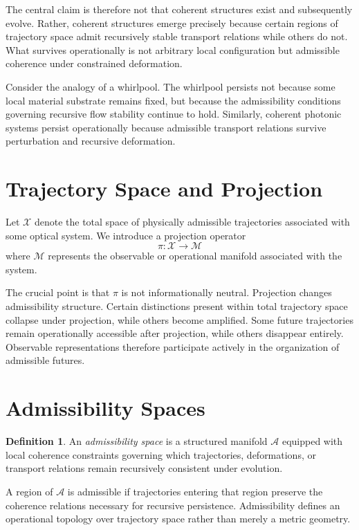 \documentclass[11pt,openany]{book}
\theoremstyle{definition}
\newtheorem{definition}{Definition}[chapter]
\theoremstyle{plain}
\newcommand{\Afield}{\mathcal{A}}
\newcommand{\Mspace}{\mathcal{M}}
\newcommand{\Xspace}{\mathcal{X}}
\begin{document}
The central claim is therefore not that coherent structures exist and subsequently evolve. Rather, coherent structures emerge precisely because certain regions of trajectory space admit recursively stable transport relations while others do not. What survives operationally is not arbitrary local configuration but admissible coherence under constrained deformation.

Consider the analogy of a whirlpool. The whirlpool persists not because some local material substrate remains fixed, but because the admissibility conditions governing recursive flow stability continue to hold. Similarly, coherent photonic systems persist operationally because admissible transport relations survive perturbation and recursive deformation.

\section{Trajectory Space and Projection}

Let $\Xspace$ denote the total space of physically admissible trajectories associated with some optical system. We introduce a projection operator
\[
\pi : \Xspace \to \Mspace
\]
where $\Mspace$ represents the observable or operational manifold associated with the system.

The crucial point is that $\pi$ is not informationally neutral. Projection changes admissibility structure. Certain distinctions present within total trajectory space collapse under projection, while others become amplified. Some future trajectories remain operationally accessible after projection, while others disappear entirely. Observable representations therefore participate actively in the organization of admissible futures.

\section{Admissibility Spaces}

\begin{definition}
An \emph{admissibility space} is a structured manifold $\Afield$ equipped with local coherence constraints governing which trajectories, deformations, or transport relations remain recursively consistent under evolution.
\end{definition}

A region of $\Afield$ is admissible if trajectories entering that region preserve the coherence relations necessary for recursive persistence. Admissibility defines an operational topology over trajectory space rather than merely a metric geometry.
\end{document}
